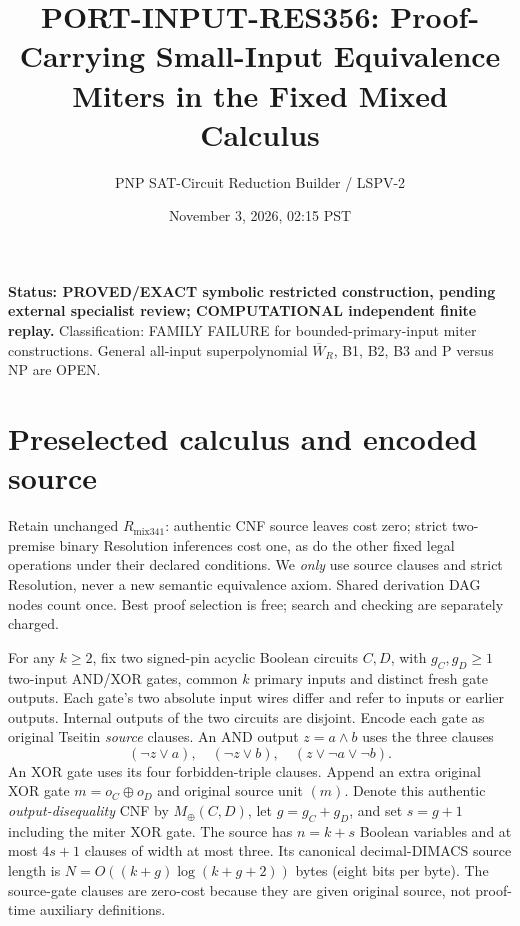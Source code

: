 \documentclass[11pt]{article}
\title{PORT-INPUT-RES356: Proof-Carrying Small-Input Equivalence Miters in the Fixed Mixed Calculus}
\author{PNP SAT-Circuit Reduction Builder / LSPV-2}
\date{November 3, 2026, 02:15 PST}
\begin{document}
\maketitle
\noindent\textbf{Status: PROVED/EXACT symbolic restricted construction, pending external specialist review; COMPUTATIONAL independent finite replay.} Classification: FAMILY FAILURE for bounded-primary-input miter constructions. General all-input superpolynomial $\overline W_R$, B1, B2, B3 and P versus NP are OPEN.

\section*{Preselected calculus and encoded source}
Retain unchanged $R_{\mathrm{mix341}}$: authentic CNF source leaves cost zero; strict two-premise binary Resolution inferences cost one, as do the other fixed legal operations under their declared conditions. We \emph{only} use source clauses and strict Resolution, never a new semantic equivalence axiom. Shared derivation DAG nodes count once. Best proof selection is free; search and checking are separately charged.

For any $k\ge2$, fix two signed-pin acyclic Boolean circuits $C,D$, with $g_C,g_D\ge1$ two-input AND/XOR gates, common $k$ primary inputs and distinct fresh gate outputs. Each gate's two absolute input wires differ and refer to inputs or earlier outputs. Internal outputs of the two circuits are disjoint. Encode each gate as original Tseitin \emph{source} clauses. An AND output $z=a\land b$ uses the three clauses
\[
(\neg z\lor a),\quad(\neg z\lor b),\quad(z\lor\neg a\lor\neg b).
\]
An XOR gate uses its four forbidden-triple clauses. Append an extra original XOR gate $m=o_C\oplus o_D$ and original source unit $(m)$. Denote this authentic \emph{output-disequality} CNF by $M_\oplus(C,D)$, let $g=g_C+g_D$, and set $s=g+1$ including the miter XOR gate. The source has $n=k+s$ Boolean variables and at most $4s+1$ clauses of width at most three. Its canonical decimal-DIMACS source length is $N=O((k+g)\log(k+g+2))$ bytes (eight bits per byte). The source-gate clauses are zero-cost because they are given original source, not proof-time auxiliary definitions.
\end{document}
